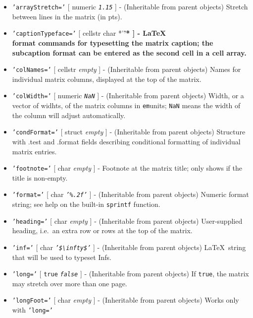 \begin{itemize}
\item
  \texttt{'arrayStretch='} {[} numeric \textbar{} \emph{\texttt{1.15}}
  {]} - (Inheritable from parent objects) Stretch between lines in the
  matrix (in pts).
\item
  \texttt{'captionTypeface='} {[} cellstr \textbar{} char \textbar{}
  *'\large\bfseries'* {]} - \LaTeX\\format commands for typesetting the
  matrix caption; the subcaption format can be entered as the second
  cell in a cell array.
\item
  \texttt{'colNames='} {[} cellstr \textbar{} \emph{empty} {]} -
  (Inheritable from parent objects) Names for individual matrix columns,
  displayed at the top of the matrix.
\item
  \texttt{'colWidth='} {[} numeric \textbar{} \emph{\texttt{NaN}} {]} -
  (Inheritable from parent objects) Width, or a vector of widhts, of the
  matrix columns in \texttt{em}units; \texttt{NaN} means the width of
  the column will adjust automatically.
\item
  \texttt{'condFormat='} {[} struct \textbar{} \emph{empty} {]} -
  (Inheritable from parent objects) Structure with .test and .format
  fields describing conditional formatting of individual matrix entries.
\item
  \texttt{'footnote='} {[} char \textbar{} \emph{empty} {]} - Footnote
  at the matrix title; only shows if the title is non-empty.
\item
  \texttt{'format='} {[} char \textbar{} \emph{\texttt{'\%.2f'}} {]} -
  (Inheritable from parent objects) Numeric format string; see help on
  the built-in \texttt{sprintf} function.
\item
  \texttt{'heading='} {[} char \textbar{} \emph{empty} {]} -
  (Inheritable from parent objects) User-supplied heading, i.e.~an extra
  row or rows at the top of the matrix.
\item
  \texttt{'inf='} {[} char \textbar{}
  \emph{\texttt{'\$\textbackslash{}infty\$'}} {]} - (Inheritable from
  parent objects) \LaTeX~string that will be used to typeset Infs.
\item
  \texttt{'long='} {[} \texttt{true} \textbar{} \emph{\texttt{false}}
  {]} - (Inheritable from parent objects) If \texttt{true}, the matrix
  may stretch over more than one page.
\item
  \texttt{'longFoot='} {[} char \textbar{} \emph{empty} {]} -
  (Inheritable from parent objects) Works only with \texttt{'long='}

\end{itemize}
